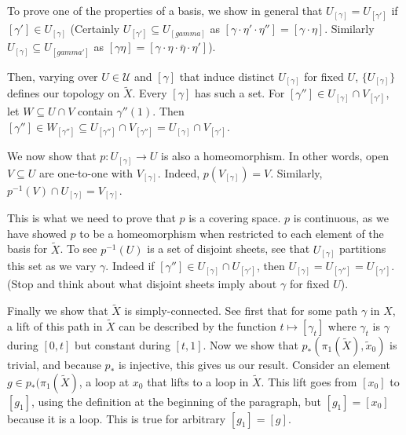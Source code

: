 \documentclass[10pt]{article}
\begin{document}
\begin{example}
	To prove one of the properties of a basis, we show in general that $U_{[\gamma]} = U_{[\gamma']}$ if $[\gamma'] \in
	U_{[\gamma]}$ (Certainly $U_{[\gamma']} \subseteq U_{[gamma]}$ as $[\gamma
	\cdot \eta' \cdot \eta''] = [\gamma \cdot \eta]$. Similarly $U_{[\gamma]}
	\subseteq U_{[gamma']}$ as $[\gamma \eta ] = [\gamma \cdot \eta \cdot
	\bar{\eta} \cdot \eta']$).

	Then, varying over $U \in \mathcal{U}$ and $[\gamma]$ that induce distinct
	$U_{[\gamma]}$ for fixed $U$, $\{ U_{[\gamma]} \}$ defines our topology on
	$\tilde{X}$. Every $[\gamma]$ has such a set. For $[\gamma''] \in
	U_{[\gamma]} \cap V_{[\gamma']}$, let $W \subseteq U \cap V$ contain
	$\gamma''(1)$. Then $[\gamma''] \in W_{[\gamma'']} \subseteq U_{[\gamma'']}
	\cap V_{[\gamma'']} = U_{[\gamma]} \cap V_{[\gamma']}$.

	We now show that $p: U_{[\gamma]} \to U$ is also a homeomorphism. In other
	words, open $V \subseteq U$ are one-to-one with $V_{[\gamma]}$. Indeed,
	$p(V_{[\gamma]}) = V$. Similarly, $p^{-1}(V) \cap U_{[\gamma]} =
	V_{[\gamma]}$.

	This is what we need to prove that $p$ is a covering space. $p$ is 
	continuous, as we have showed $p$ to be a homeomorphism when restricted to each element of the
	basis for $\tilde{X}$. To see $p^{-1}(U)$ is a set of disjoint sheets, see
	that $U_{[\gamma]}$ partitions this set as we vary $\gamma$. Indeed if
	$[\gamma''] \in U_{[\gamma]} \cap U_{[\gamma']}$, then $U_{[\gamma]} =
	U_{[\gamma'']} = U_{[\gamma']}$. (Stop and think about what disjoint sheets
	imply about $\gamma$ for fixed $U$).

	Finally we show that $\tilde{X}$ is simply-connected. See first that for some
	path $\gamma$ in $X$, a lift of this path in $\tilde{X}$ can be described by
	the function $t \mapsto [\gamma_t]$ where $\gamma_t$ is $\gamma$ during $[0,
	t]$ but constant during $[t, 1]$. Now we show that $p_*(\pi_1(\tilde{X}),
	\tilde{x}_0)$ is trivial, and because $p_*$ is injective, this gives us our
	result. Consider an element $g \in p_*(\pi_1(\tilde{X})$, a loop at $x_0$
	that lifts to a loop in $\tilde{X}$. This lift goes from $[x_0]$ to $[g_1]$,
	using the definition at the beginning of the paragraph,
	but $[g_1] = [x_0]$ because it is a loop. This is true for arbitrary $[g_1] =
	[g]$.
\end{example}
\end{document}
